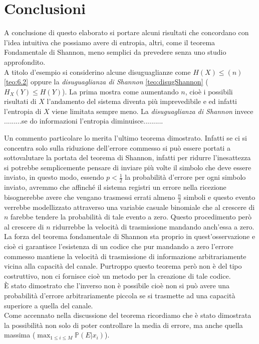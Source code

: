 \chapter{Conclusioni}
\label{cha:conclusioni}
A conclusione di questo elaborato si portare alcuni risultati che concordano con l'idea intuitiva che possiamo avere di entropia, altri, come il teorema Fondamentale di Shannon, meno semplici da prevedere senza uno studio approfondito.\\
A titolo d'esempio si considerino alcune disuguaglianze come $H(X)\leq(n)$ \ref{teo:6.2} oppure la \textit{disuguaglianza di Shannon} \ref{teo:disugShannon} ($H_X(Y)\leq H(Y)$). La prima mostra come aumentando $n$, cioè i possibili risultati di $X$ l'andamento  del sistema diventa più imprevedibile e ed infatti l'entropia di $X$ viene limitata sempre meno. La \textit{disuguaglianza di Shannon} invece .........se do informazioni l'entropia diminuisce..........

Un commento particolare lo merita l'ultimo teorema dimostrato. Infatti se ci si concentra solo sulla riduzione dell'errore commesso si può essere portati a sottovalutare la portata del teorema di Shannon, infatti per ridurre l'inesattezza si potrebbe semplicemente pensare di inviare più volte il simbolo che deve essere inviato, in questo modo, essendo $p<\frac{1}{2}$ la probabilità d'errore per ogni simbolo inviato, avremmo che affinché il sistema registri un errore nella ricezione bisognerebbe avere che vengano trasmessi errati almeno $\frac{n}{2}$ simboli e questo evento verrebbe modellizzato attraverso una variabie casuale binomiale che al crescere di $n$ farebbe tendere la probabilità di tale evento a zero. Questo procedimento però al crescere di $n$ ridurrebbe la velocità di trasmissione mandando anch'essa a zero. La forza del teorema fondamentale di Shannon sta proprio in quest'osservazione e cioè ci garantisce l'esistenza di un codice che pur mandando a zero l'errore commesso mantiene la velocità di trasmissione di informazione arbitrariamente vicina alla capacità del canale. Purtroppo questo teorema però non è del tipo costruttivo, non ci fornisce cioè un metodo per la creazione di tale codice.\\
È stato dimostrato che l'inverso non è possibile cioè non si può avere una probabilità d'errore arbitrariamente piccola se si trasmette ad una capacità superiore a quella del canale.\\
Come accennato nella discussione del teorema ricordiamo che  è stato dimostrata la possibilità non solo di poter controllare la media di errore, ma anche quella massima ($\max_{1\leq i \leq M} \mathbb{P}(E|x_i)$).\\







